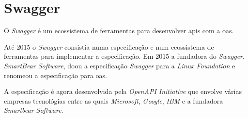 




\section{Swagger}
O \textit{Swagger} é um ecossistema de ferramentas para desenvolver \acrshort{api}s com a \acrfull{oas}.

Até 2015 o \textit{Swagger} consistia numa especificação e num ecossistema de ferramentas para implementar a especificação. Em 2015 a fundadora do \textit{Swagger}, \textit{SmartBear Software}, doou a especificação \textit{Swagger} para a \textit{Linux Foundation} e renomeou a especificação para \acrlong{oas}.~\cite{wiswagger}

A especificação é agora desenvolvida pela \textit{OpenAPI Initiative} que envolve várias empresas tecnológias entre as quais \textit{Microsoft}, \textit{Google}, \textit{IBM} e a fundadora \textit{Smartbear Software}.

